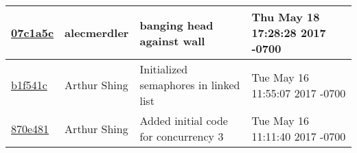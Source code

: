 \begin{tabular}{l l l l}
\href{https://github.com/alecmerdler/cs-444-group-119/commit/07c1a5c4eeba4ce006bc02f34db8649bc7183be0}{07c1a5c} & alecmerdler & banging head against wall & Thu May 18 17:28:28 2017 -0700\\\hline
\href{https://github.com/alecmerdler/cs-444-group-119/commit/b1f541cd8f4d8edba89a3dff184530fea1886a86}{b1f541c} & Arthur Shing & Initialized semaphores in linked list & Tue May 16 11:55:07 2017 -0700\\\hline
\href{https://github.com/alecmerdler/cs-444-group-119/commit/870e481b8ef72036c364cae34427d16f1695d68a}{870e481} & Arthur Shing & Added initial code for concurrency 3 & Tue May 16 11:11:40 2017 -0700\\\hline\end{tabular}
